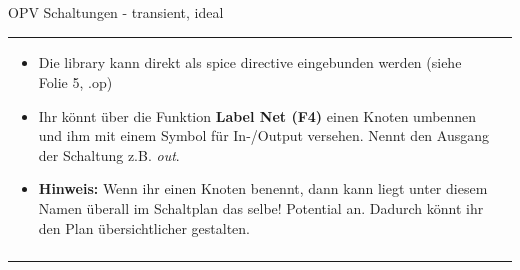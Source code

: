 \begin{frame}[t]{OPV Schaltungen - transient, ideal}
\begin{spacing}{0.9}
\begin{tiny}
\begin{table}[h!]
\begin{tabular}{p{3cm} p{7cm}}
\begin{minipage}{.7\textwidth}
\begin{itemize}
          \item Die library kann direkt als spice directive eingebunden werden (siehe Folie 5, .op)
          \item Ihr könnt über die Funktion \textbf{Label Net (F4)} einen Knoten umbennen und ihm mit einem Symbol für In-/Output versehen. Nennt den Ausgang der Schaltung z.B. \textit{out}.
          \item \textbf{Hinweis:} Wenn ihr einen Knoten benennt, dann kann liegt unter diesem Namen überall im Schaltplan das selbe! Potential an. 
          Dadurch könnt ihr den Plan übersichtlicher gestalten. 
        \end{itemize}
        \end{minipage} 
        \\
         & \\
         \hline
      \end{tabular}
    
    \end{table}
    
    \end{tiny} \end{spacing}
    
     \end{frame}
    
